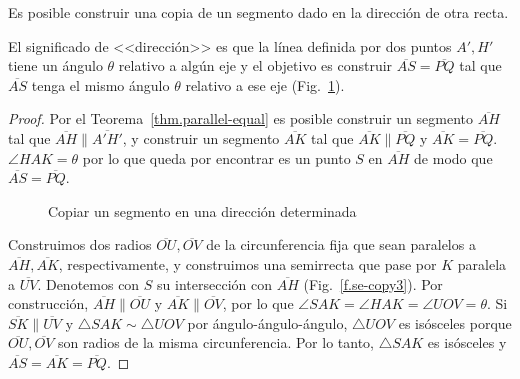 \begin{theorem}\label{thm.straight-direction}
Es posible construir una copia de un segmento dado en la dirección de otra recta.
\end{theorem}

El significado de <<dirección>> es que la línea definida por dos puntos $A',H'$ tiene un ángulo $\theta$ relativo a algún eje y el objetivo es construir $\overline{AS}=\overline{PQ}$ tal que $\overline{AS}$ tenga el mismo ángulo $\theta$ relativo a ese eje (Fig.~\ref{f.se-copy1}).

\begin{proof}
Por el Teorema~\ref{thm.parallel-equal} es posible construir un segmento $\overline{AH}$ tal que $\overline{AH}\parallel\overline{A'H'}$, y construir un segmento $\overline{AK}$ tal que $\overline{AK}\parallel\overline{PQ}$ y $\overline{AK}=\overline{PQ}$.
$\angle HAK=\theta$ por lo que queda por encontrar es un punto $S$ en $\overline{AH}$ de modo que $\overline{AS}=\overline{PQ}$.

\begin{figure}[t]
\begin{center}
\end{center}
\caption{Copiar un segmento en una dirección determinada}\label{f.se-copy1}
\end{figure}

Construimos dos radios $\overline{OU}, \overline{OV}$ de la circunferencia fija que sean paralelos a $\overline{AH}, \overline{AK}$, respectivamente, y construimos una semirrecta que pase por $K$ paralela a $\overline{UV}$. Denotemos con $S$ su intersección con $\overline{AH}$ (Fig.~\ref{f.se-copy3}). Por construcción, $\overline{AH}\parallel\overline{OU}$ y $\overline{AK}\parallel\overline{OV}$, por lo que $\angle SAK=\angle HAK=\angle UOV=\theta$. Si $\overline{SK}\parallel\overline{UV}$ y $\triangle SAK\sim\triangle UOV$ por ángulo-ángulo-ángulo, $\triangle UOV$ es isósceles porque $\overline{OU}, \overline{OV}$ son radios de la misma circunferencia. Por lo tanto, $\triangle SAK$ es isósceles y $\overline{AS}=\overline{AK}=\overline{PQ}$.
\end{proof}


